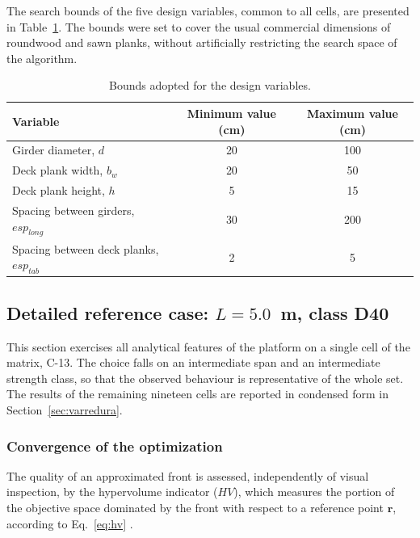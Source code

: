 The search bounds of the five design variables, common to all cells, are presented in Table~\ref{tab:intervalos}.
The bounds were set to cover the usual commercial dimensions of roundwood and sawn planks, without artificially restricting the search space of the algorithm.

\begin{table}[!ht]
\caption{Bounds adopted for the design variables.\label{tab:intervalos}}
\begin{threeparttable}
\begin{tabular*}{\columnwidth}{@{\extracolsep\fill}lcc@{\extracolsep\fill}}
\toprule
Variable & Minimum value (cm) & Maximum value (cm) \\
\midrule
Girder diameter, $d$ & 20 & 100 \\
Deck plank width, $b_w$ & 20 & 50 \\
Deck plank height, $h$ & 5 & 15 \\
Spacing between girders, $esp_{long}$ & 30 & 200 \\
Spacing between deck planks, $esp_{tab}$ & 2 & 5 \\
\bottomrule
\end{tabular*}
\end{threeparttable}
\end{table}

\subsection{Detailed reference case: $L = 5.0$~m, class D40}\label{sec:caso_detalhado}

This section exercises all analytical features of the platform on a single cell of the matrix, C-13.
The choice falls on an intermediate span and an intermediate strength class, so that the observed behaviour is representative of the whole set.
The results of the remaining nineteen cells are reported in condensed form in Section~\ref{sec:varredura}.

\subsubsection{Convergence of the optimization}\label{sec:hipervolume}

The quality of an approximated front is assessed, independently of visual inspection, by the hypervolume indicator ($HV$), which measures the portion of the objective space dominated by the front with respect to a reference point $\mathbf{r}$, according to Eq.~\eqref{eq:hv} \parencite{blank2020}.

